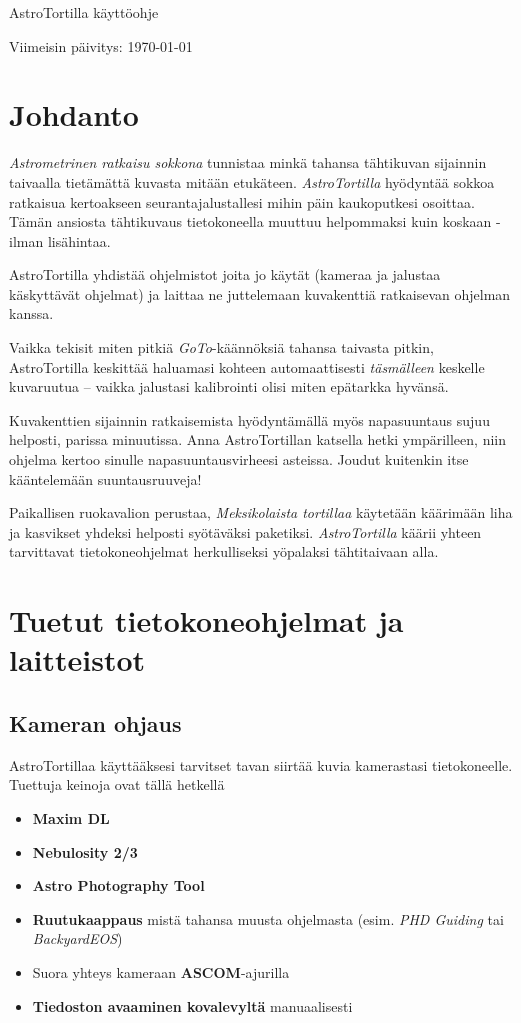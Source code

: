 \documentclass{article}
\begin{document}
\centerline{\sf \Huge AstroTortilla käyttöohje}
\centerline{Viimeisin päivitys: \today}

\tableofcontents

\setlength{\parindent}{0pt}
\setlength{\parskip}{2ex}

\newpage

\section{Johdanto}

\emph{Astrometrinen ratkaisu sokkona} tunnistaa minkä tahansa tähtikuvan 
sijainnin taivaalla tietämättä kuvasta mitään etukäteen. \emph{AstroTortilla} 
hyödyntää sokkoa ratkaisua kertoakseen seurantajalustallesi mihin päin kaukoputkesi
osoittaa. Tämän ansiosta tähtikuvaus tietokoneella muuttuu helpommaksi kuin koskaan - ilman lisähintaa.

AstroTortilla yhdistää ohjelmistot joita jo käytät (kameraa ja jalustaa käskyttävät ohjelmat) 
ja laittaa ne juttelemaan kuvakenttiä ratkaisevan ohjelman kanssa.

Vaikka tekisit miten pitkiä \emph{GoTo}-käännöksiä tahansa taivasta pitkin, 
AstroTortilla keskittää haluamasi kohteen automaattisesti \emph{täsmälleen} 
keskelle kuvaruutua -- vaikka jalustasi kalibrointi olisi miten epätarkka hyvänsä.

Kuvakenttien sijainnin ratkaisemista hyödyntämällä myös napasuuntaus sujuu helposti, parissa minuutissa.
Anna AstroTortillan katsella hetki ympärilleen, niin ohjelma kertoo sinulle napasuuntausvirheesi asteissa.
Joudut kuitenkin itse kääntelemään suuntausruuveja!

Paikallisen ruokavalion perustaa, \emph{Meksikolaista tortillaa} käytetään
käärimään liha ja kasvikset yhdeksi helposti syötäväksi paketiksi.
\emph{AstroTortilla} käärii yhteen tarvittavat tietokoneohjelmat herkulliseksi
yöpalaksi tähtitaivaan alla.
 

\section{Tuetut tietokoneohjelmat ja laitteistot} 
\subsection{Kameran ohjaus}

AstroTortillaa käyttääksesi tarvitset tavan siirtää kuvia kamerastasi tietokoneelle. Tuettuja keinoja ovat tällä hetkellä
\begin{itemize}
\item \textbf{{Maxim DL}} 
\item \textbf{{Nebulosity 2/3}} 
\item \textbf{{Astro Photography Tool}} 
\item \textbf{{Ruutukaappaus}} mistä tahansa muusta ohjelmasta (esim. \emph{PHD Guiding} tai \emph{BackyardEOS})
\item Suora yhteys kameraan \textbf{ASCOM}-ajurilla
\item \textbf{Tiedoston avaaminen kovalevyltä} manuaalisesti
\end{itemize}
\end{document}
